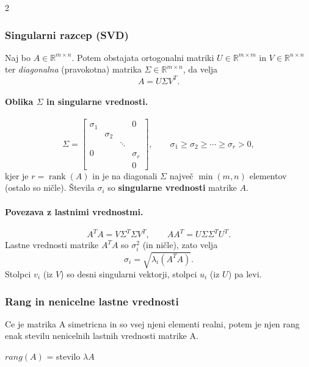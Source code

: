 \documentclass{article}
\begin{document}
\begin{multicols}{2}
	\subsubsection{Singularni razcep (SVD)}

	Naj bo \(A \in \mathbb{R}^{m\times n}\). Potem obstajata ortogonalni matriki
	\(U \in \mathbb{R}^{m\times m}\) in \(V \in \mathbb{R}^{n\times n}\) ter
	\emph{diagonalna} (pravokotna) matrika \(\Sigma \in \mathbb{R}^{m\times n}\), da velja
	\[
		A = U \Sigma V^T.
	\]

	\paragraph{Oblika \(\Sigma\) in singularne vrednosti.}
	\[
		\Sigma =
		\begin{bmatrix}
			\sigma_1 &          &        & 0        \\
			         & \sigma_2 &        &          \\
			         &          & \ddots &          \\
			0        &          &        & \sigma_r \\
			         &          &        & 0
		\end{bmatrix},
		\qquad
		\sigma_1 \ge \sigma_2 \ge \cdots \ge \sigma_r > 0,
	\]
	kjer je \(r=\operatorname{rank}(A)\) in je na diagonali \(\Sigma\) največ \(\min(m,n)\) elementov
	(ostalo so ničle). Števila \(\sigma_i\) so \textbf{singularne vrednosti} matrike \(A\).

	\paragraph{Povezava z lastnimi vrednostmi.}
	\[
		A^T A = V \Sigma^T \Sigma V^T,
		\qquad
		A A^T = U \Sigma \Sigma^T U^T.
	\]
	Lastne vrednosti matrike \(A^T A\) so \(\sigma_i^2\) (in ničle), zato velja
	\[
		\sigma_i = \sqrt{\lambda_i(A^T A)}.
	\]
	Stolpci \(v_i\) (iz \(V\)) so desni singularni vektorji, stolpci \(u_i\) (iz \(U\)) pa levi.


	\subsubsection{Rang in nenicelne lastne vrednosti}

	Ce je  matrika A simetricna in so vsej njeni elementi realni, potem je njen rang enak stevilu nenicelnih lastnih
	vrednosti matrike A.
	\begin{center}
		$rang(A)$ = stevilo $\lambda A$
	\end{center}


\end{multicols}
\end{document}
